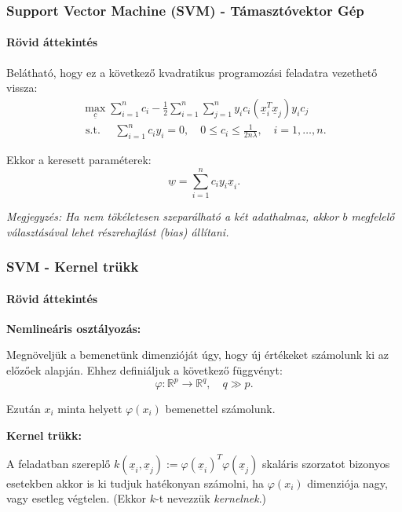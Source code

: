 \documentclass[11pt]{beamer}
\newcommand{\sumn}[1]{\sum\limits_{{#1}=1}^{n}}
\begin{document}
\begin{frame}
	\frametitle{Support Vector Machine (SVM) - Támasztóvektor Gép}
	\framesubtitle{Rövid áttekintés}
	
	Belátható, hogy ez a következő kvadratikus programozási feladatra vezethető vissza:
	\begin{multline*}
	\max\limits_{\underline{c}} \sum\limits_{i=1}^{n}c_i -  
	\frac{1}{2}\sumn{i}\sumn{j} y_i c_i (\underline{x}_i^T \underline{x}_j) y_i c_j \\
	\text{ s.t. } \quad 
	\sumn{i} c_i y_i = 0, \quad
	0 \leq c_i \leq \frac{1}{2n\lambda}, \quad 
	i=1,\dots,n.
	\end{multline*}
	
	Ekkor a keresett paraméterek:
	\[
	\underline{w} = \sumn{i} c_i y_i \underline{x}_i.
	\]
	
	
	\textit{Megjegyzés: Ha nem tökéletesen szeparálható a két adathalmaz, akkor $ b $ megfelelő választásával lehet részrehajlást (bias) állítani.}
\end{frame}




\begin{frame}
	\frametitle{SVM - Kernel trükk}
	\framesubtitle{Rövid áttekintés}
	\textbf{Nemlineáris osztályozás:}
	
	Megnöveljük a bemenetünk dimenzióját úgy, hogy új értékeket számolunk ki az előzőek alapján. Ehhez definiáljuk a következő függvényt:
	\[
	\varphi\colon \mathbb{R}^p \rightarrow \mathbb{R}^q, \quad q \gg p.
	\]
	
	Ezután $ x_i $ minta helyett $ \varphi(x_i) $ bemenettel számolunk.
	
	\textbf{Kernel trükk: }
	
	A feladatban szereplő $ k(\underline{x}_i, \underline{x}_j) := \varphi(\underline{x}_i)^T \varphi(\underline{x}_j) $ skaláris szorzatot bizonyos esetekben akkor is ki tudjuk hatékonyan számolni, ha $ \varphi(x_i) $ dimenziója nagy, vagy esetleg végtelen. (Ekkor $ k $-t nevezzük \textit{kernelnek}.)
	


\end{frame}

%	
%	
%
%		
%
%
\end{document}
